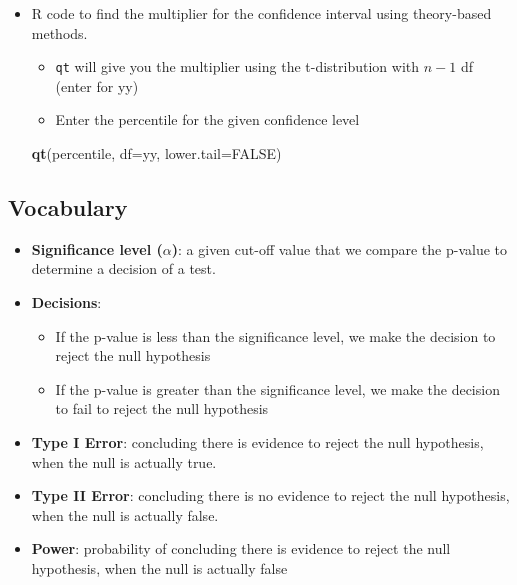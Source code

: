 \documentclass[
]{report}
\newenvironment{Shaded}{\begin{snugshade}}{\end{snugshade}}
\newcommand{\AttributeTok}[1]{\textcolor[rgb]{0.13,0.29,0.53}{#1}}
\newcommand{\ConstantTok}[1]{\textcolor[rgb]{0.56,0.35,0.01}{#1}}
\newcommand{\FunctionTok}[1]{\textcolor[rgb]{0.13,0.29,0.53}{\textbf{#1}}}
\newcommand{\NormalTok}[1]{#1}
\begin{document}
\begin{itemize}
\item
  R code to find the multiplier for the confidence interval using theory-based methods.

  \begin{itemize}
  \item
    \texttt{qt} will give you the multiplier using the t-distribution with \(n-1\) df (enter for yy)
  \item
    Enter the percentile for the given confidence level
  \end{itemize}

\begin{Shaded}
\begin{Highlighting}[]
\FunctionTok{qt}\NormalTok{(percentile, }\AttributeTok{df=}\NormalTok{yy, }\AttributeTok{lower.tail=}\ConstantTok{FALSE}\NormalTok{)}
\end{Highlighting}
\end{Shaded}
\end{itemize}

\newpage

\subsection*{Vocabulary}\label{vocabulary-1}

\begin{itemize}
\item
  \textbf{Significance level (\(\alpha\))}: a given cut-off value that we compare the p-value to determine a decision of a test.
\item
  \textbf{Decisions}:

  \begin{itemize}
  \item
    If the p-value is less than the significance level, we make the decision to reject the null hypothesis
  \item
    If the p-value is greater than the significance level, we make the decision to fail to reject the null hypothesis
  \end{itemize}
\item
  \textbf{Type I Error}: concluding there is evidence to reject the null hypothesis, when the null is actually true.
\item
  \textbf{Type II Error}: concluding there is no evidence to reject the null hypothesis, when the null is actually false.
\item
  \textbf{Power}: probability of concluding there is evidence to reject the null hypothesis, when the null is actually false
\end{itemize}
\end{document}
